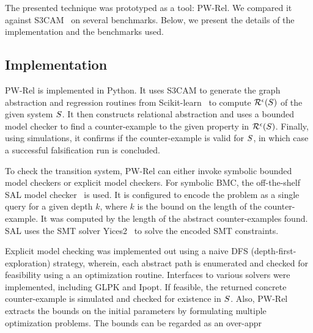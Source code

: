 The presented technique was prototyped as a tool: PW-Rel.  We
compared it against S3CAM~\cite{zutshi2014multiple} on several
benchmarks. Below, we present the details of the implementation and
the benchmarks used.

\subsection{Implementation}

PW-Rel is implemented in Python. It uses S3CAM to generate the graph
abstraction and regression routines from
Scikit-learn~\cite{pedregosa2011scikit} to compute
$\mathcal{R}^{\epsilon}(S)$ of the given system $S$.
It then constructs relational abstraction and uses a bounded model
checker to find a counter-example to the given property in
$\mathcal{R}^{\epsilon}(S)$. Finally, using simulations, it
confirms if the counter-example is valid for $S$, in which case
a successful falsification run is concluded.

To check the transition system, PW-Rel can either invoke symbolic
bounded model checkers or explicit model checkers. For symbolic BMC,
the off-the-shelf SAL model checker~\cite{SAL-SRI} is used. It is
configured to encode the problem as a single query for a given depth
$k$, where $k$ is the bound on the length of the counter-example. It
was computed by the length of the abstract counter-examples found. SAL
uses the SMT solver Yices2~\cite{dutertre2014yices} to solve the
encoded SMT constraints.


Explicit model checking was implemented out using a naive DFS
(depth-first-exploration) strategy, wherein, each abstract path is
enumerated and checked for feasibility using a an optimization
routine. Interfaces to various solvers were implemented, including GLPK
and Ipopt. If feasible, the returned concrete counter-example is
simulated and checked for existence in $S$. Also, PW-Rel
extracts the bounds on the initial parameters by formulating multiple
optimization problems. The bounds can be regarded as an over-appr


